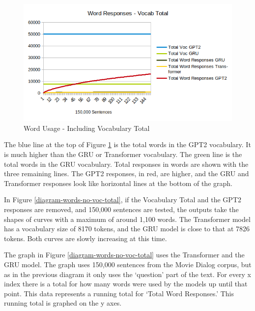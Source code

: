 \begin{figure}[H]
	\begin{center}
		\includegraphics[scale=0.75]{diagram-output-total-responses-05}
		
		
	\end{center}
	\caption[Word Usage]{Word Usage - Including Vocabulary Total}
	\label{diagram-words-with-voc-total}
	
\end{figure}

The blue line at the top of Figure \ref{diagram-words-with-voc-total} is the total words in the GPT2 vocabulary. It is much higher than the GRU or Transformer vocabulary.
The green line is the total words in the GRU vocabulary. Total responses in words are shown with the three remaining lines. The GPT2 responses, in red, are higher, and the GRU and Transformer responses look like horizontal lines at the bottom of the graph.

In Figure \ref{diagram-words-no-voc-total}, if the Vocabulary Total and the GPT2 responses are removed, and 150,000 sentences are tested, the outputs take the shapes of curves with a maximum of around 1,100 words. The Transformer model has a vocabulary size of 8170 tokens, and the GRU model is close to that at 7826 tokens. Both curves are slowly increasing at this time.

The graph in Figure \ref{diagram-words-no-voc-total} uses the Transformer and the GRU model. The graph uses 150,000 sentences from the Movie Dialog corpus, but as in the previous diagram it only uses the `question' part of the text. For every x index there is a total for how many words were used by the models up until that point. This data represents a running total for `Total Word Responses.' This running total is graphed on the y axes. 


